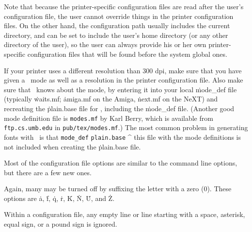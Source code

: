 Note that because the printer-specific configuration files are read
after the user's configuration file, the user cannot override things in
the printer configuration files.  On the other hand, the configuration path
usually includes the current directory, and can be set to include the
user's home directory (or any other directory of the user), so the user can
always provide his or her own printer-specific configuration files that will
be found before the system global ones.

If your printer uses a different resolution than 300 dpi,
make sure that you
have given a \MF\ mode as well as a resolution in the printer
configuration file.  Also make sure that \MF\ knows about the mode,
by entering it into your local \.{mode\_def} file (typically
\.{waits.mf}; \.{amiga.mf} on the Amiga, \.{next.mf} on the NeXT)
and recreating the \.{plain.base} file for \MF, including the
\.{mode\_def} file.  (Another good mode definition file is
{\tt modes.mf} by Karl Berry, which is available from
{\tt ftp.cs.umb.edu} in {\tt pub/tex/modes.mf}.)
The most common problem in generating fonts
with \MF\ is that
\^{{\tt mode\_def}}
\^{{\tt plain.base}}
\^{\MF}
this file with the mode definitions is not included when creating
the \.{plain.base} file.


Most of the configuration file options are similar to the command line
options, but there are a few new ones.

Again, many may be turned off by suffixing the letter with a zero (0).
These options are \.a, \.f, \.q, \.r, \.K, \.N, \.U, and \.Z.

Within a configuration file, any empty line or line starting with a space,
asterisk, equal sign, or a pound sign is ignored.

